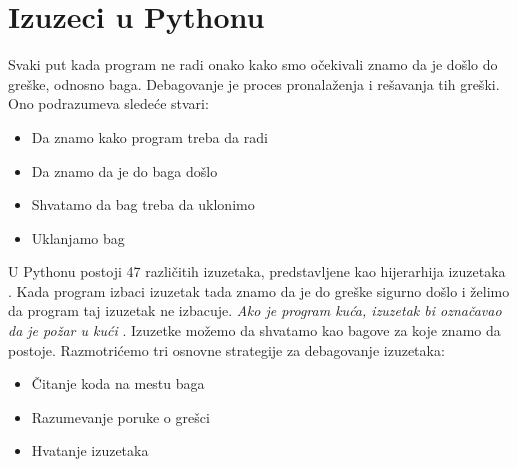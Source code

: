 \documentclass[a4paper]{article}
\begin{document}
\section{Izuzeci u Pythonu}
Svaki put kada program ne radi onako kako smo očekivali znamo da je došlo do greške, odnosno baga. Debagovanje je proces pronalaženja i rešavanja tih greški. Ono podrazumeva sledeće stvari:
\begin{itemize}
\item Da znamo kako program treba da radi
\item Da znamo da je do baga došlo
\item Shvatamo da bag treba da uklonimo
\item Uklanjamo bag
\end{itemize}
U Pythonu postoji 47 različitih izuzetaka, predstavljene kao hijerarhija izuzetaka \cite{excDocPyt}. Kada program izbaci izuzetak tada znamo da je do greške sigurno došlo i želimo da program taj izuzetak ne izbacuje. \emph{Ako je program kuća, izuzetak bi označavao da je požar u kući} \cite{proPyDeb}. Izuzetke možemo da shvatamo kao bagove za koje znamo da postoje. Razmotrićemo tri osnovne strategije za debagovanje izuzetaka:
\begin{itemize}
\item Čitanje koda na mestu baga
\item Razumevanje poruke o grešci
\item Hvatanje izuzetaka
\end{itemize}
\end{document}
